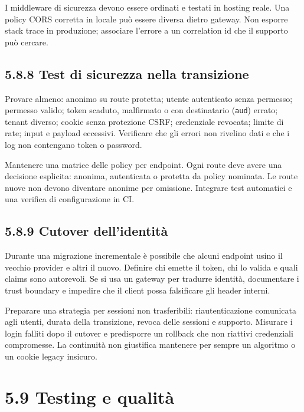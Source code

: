 \documentclass[
  italian,
  10pt,
]{book}
\begin{document}
I middleware di sicurezza devono essere ordinati e testati in hosting
reale. Una policy CORS corretta in locale può essere diversa dietro
gateway. Non esporre stack trace in produzione; associare l'errore a un
correlation id che il supporto può cercare.

\subsection{5.8.8 Test di sicurezza nella
transizione}\label{test-di-sicurezza-nella-transizione}

Provare almeno: anonimo su route protetta; utente autenticato senza
permesso; permesso valido; token scaduto, malfirmato o con destinatario
(\texttt{aud}) errato; tenant diverso; cookie senza protezione CSRF;
credenziale revocata; limite di rate; input e payload eccessivi.
Verificare che gli errori non rivelino dati e che i log non contengano
token o password.

Mantenere una matrice delle policy per endpoint. Ogni route deve avere
una decisione esplicita: anonima, autenticata o protetta da policy
nominata. Le route nuove non devono diventare anonime per omissione.
Integrare test automatici e una verifica di configurazione in CI.

\subsection{5.8.9 Cutover dell'identità}\label{cutover-dellidentituxe0}

Durante una migrazione incrementale è possibile che alcuni endpoint
usino il vecchio provider e altri il nuovo. Definire chi emette il
token, chi lo valida e quali claims sono autorevoli. Se si usa un
gateway per tradurre identità, documentare i trust boundary e impedire
che il client possa falsificare gli header interni.

Preparare una strategia per sessioni non trasferibili: riautenticazione
comunicata agli utenti, durata della transizione, revoca delle sessioni
e supporto. Misurare i login falliti dopo il cutover e predisporre un
rollback che non riattivi credenziali compromesse. La continuità non
giustifica mantenere per sempre un algoritmo o un cookie legacy
insicuro.

\section{5.9 Testing e qualità}\label{testing-e-qualituxe0}
\end{document}
